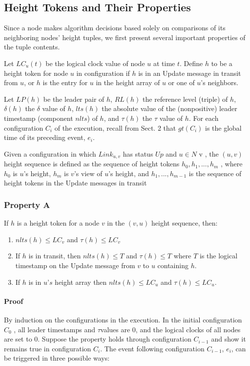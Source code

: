 \documentclass{article}
\begin{document}
\subsection{Height Tokens and Their Properties}
Since a node makes algorithm decisions based solely on comparisons of its neighboring nodes’ height tuples, we first present several important properties of the tuple contents.

Let $LC_u(t)$ be the logical clock value of node $u$ at time $t$. Define $h$ to be a height token for node $u$ in configuration if $h$ is in an Update message in transit from $u$, or $h$ is the entry for $u$ in the height array of $u$ or one of $u$’s neighbors.

Let $LP(h)$ be the leader pair of $h$, $RL(h)$ the reference level (triple) of $h$, $\delta (h)$ the $\delta$ value of $h$, $lts(h)$ the absolute value of the (nonpositive) leader timestamp (component $nlts$) of $h$, and $\tau (h)$ the $\tau $ value of $h$. For each configuration $C_i$ of the execution, recall from Sect. 2 that $gt(C_i)$ is the global time of its preceding event, $e_i$.

Given a configuration in which $Link_{u, v}$ has status $Up$ and $u \in N$ v , the $(u, v)$ height sequence is defined as the sequence of height tokens $h_0, h_1, ..., h_m$ , where $h_0$ is $u$’s height, $h_m$ is $v$’s view of $u$’s height, and $h_1, ..., h_{m − 1}$ is the sequence of height tokens in the Update messages in transit

\subsubsection{Property A}
If $h$ is a height token for a node $v$ in the $(v, u)$ height sequence, then:
\begin{enumerate}
\item $nlts(h) \leq LC_v$ and $\tau (h) \leq LC_v$
\item If $h$ is in transit, then $nlts(h) ≤ T$ and $\tau (h) \leq T$ where $T$ is the logical timestamp on the Update message from $v$ to $u$ containing $h$.
\item If $h$ is in $u’s$ height array then $nlts(h) \leq LC_u$ and $\tau (h) \leq LC_u$.
\end{enumerate}

\paragraph{Proof}
By induction on the configurations in the execution.
In the initial configuration $C_0$ , all leader timestamps and $\tau $values are 0, and the logical clocks of all nodes are set to 0. Suppose the property holds through configuration $C_{i − 1}$ and show it remains true in configuration $C_i$.
The event following configuration $C_{i − 1}$, $e_i$, can be triggered in three possible ways:
\end{document}
